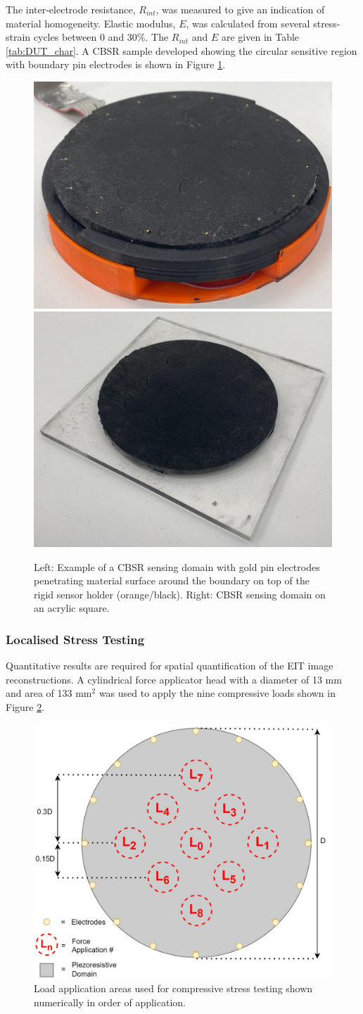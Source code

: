 The inter-electrode resistance, $R_{int}$, was measured to give an indication of material homogeneity. Elastic modulus, $E$, was calculated from several stress-strain cycles between 0 and 30\%. The $R_{int}$ and $E$ are given in Table \ref{tab:DUT_char}. A CBSR sample developed showing the circular sensitive region with boundary pin electrodes is shown in Figure \ref{fig:CBSR sample and holder}.
\begin{figure}[H]
    \centering
    \includegraphics[width=0.3\linewidth]{Figures/CBSR_DUT_w_electrodes_sample.jpg}
    \includegraphics[width=0.3\linewidth]{Figures/CBSR_DUT_sample.jpg}
    \caption{Left: Example of a CBSR sensing domain with gold pin electrodes penetrating material surface around the boundary on top of the rigid sensor holder (orange/black). Right: CBSR sensing domain on an acrylic square.}
    \label{fig:CBSR sample and holder}
\end{figure}

\subsubsection{Localised Stress Testing} \label{sec:Localised Stress Testing}
Quantitative results are required for spatial quantification of the EIT image reconstructions. A cylindrical force applicator head with a diameter of 13 mm and area of 133 mm$^2$ was used to apply the nine compressive loads shown in Figure \ref{fig:force_app_map}.
\begin{figure}[H]
    \centering
    \includegraphics[width=0.6\linewidth]{Figures/EIT_force_app_points_v3.11.jpg}
    \caption{Load application areas used for compressive stress testing shown numerically in order of application.}
    \label{fig:force_app_map}
\end{figure}

